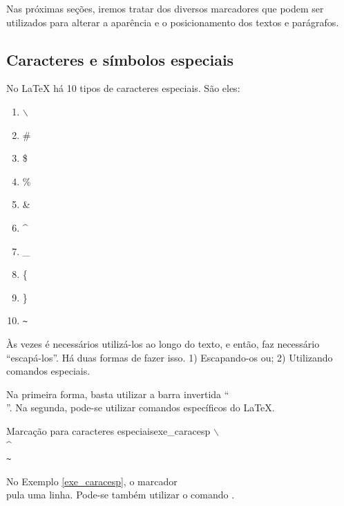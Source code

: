 Nas próximas seções, iremos tratar dos diversos marcadores que podem ser utilizados para alterar a aparência e o posicionamento dos textos e parágrafos.

\subsection{Caracteres e símbolos especiais}
\label{sec:carac_especiais}

No \LaTeX{} há 10 tipos de caracteres especiais. São eles:

\begin{multicols}{5}
    \begin{enumerate}
        \item $\backslash$
        \item \#
        \item \$
        \item \%
        \item \&
        \item \^{}
        \item \_
        \item \{
        \item \}
        \item \texttt{\~{}}
    \end{enumerate}
\end{multicols}

Às vezes é necessários utilizá-los ao longo do texto, e então, faz necessário ``escapá-los''. Há duas formas de fazer isso. 1) Escapando-os ou; 2) Utilizando comandos especiais.

Na primeira forma, basta utilizar a barra invertida ``\texttt{\\}''. Na segunda, pode-se utilizar comandos específicos do \LaTeX{}. 

\begin{texexptitled}[breakable,center lower,enhanced,middle=2mm,listing side text]{Marcação para caracteres especiais}{exe_caracesp}
$\backslash$ \\
\^{} \\
\texttt{\~{}}
\end{texexptitled}

\begin{marker}
  No Exemplo \ref{exe_caracesp}, o marcador \texttt{\\} pula uma linha. Pode-se também utilizar o comando \texttt{\newline}.
\end{marker}

